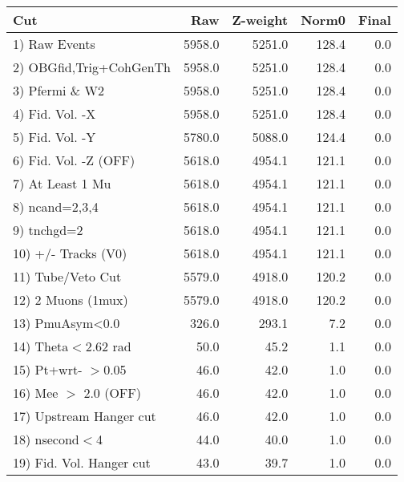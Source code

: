  \begin{table}[h!]\centering
 \begin{tabular}{||l||r|r|r|r||}
 \hline
 \hline
 Cut & Raw & Z-weight & Norm0 & Final \\
 \hline
  1) Raw Events           &      5958.0 &      5251.0 &       128.4 &         0.0 \\
  2) OBGfid,Trig+CohGenTh &      5958.0 &      5251.0 &       128.4 &         0.0 \\
  3) Pfermi \& W2         &      5958.0 &      5251.0 &       128.4 &         0.0 \\
  4) Fid. Vol. -X         &      5958.0 &      5251.0 &       128.4 &         0.0 \\
  5) Fid. Vol. -Y         &      5780.0 &      5088.0 &       124.4 &         0.0 \\
  6) Fid. Vol. -Z (OFF)   &      5618.0 &      4954.1 &       121.1 &         0.0 \\
  7) At Least 1 Mu        &      5618.0 &      4954.1 &       121.1 &         0.0 \\
  8) ncand=2,3,4          &      5618.0 &      4954.1 &       121.1 &         0.0 \\
  9) tnchgd=2             &      5618.0 &      4954.1 &       121.1 &         0.0 \\
 10) +/- Tracks (V0)      &      5618.0 &      4954.1 &       121.1 &         0.0 \\
 11) Tube/Veto Cut        &      5579.0 &      4918.0 &       120.2 &         0.0 \\
 12) 2 Muons (1mux)       &      5579.0 &      4918.0 &       120.2 &         0.0 \\
 13) PmuAsym<0.0          &       326.0 &       293.1 &         7.2 &         0.0 \\
 14) Theta$<$2.62 rad     &        50.0 &        45.2 &         1.1 &         0.0 \\
 15) Pt+wrt- $>$0.05      &        46.0 &        42.0 &         1.0 &         0.0 \\
 16) Mee $>$ 2.0  (OFF)   &        46.0 &        42.0 &         1.0 &         0.0 \\
 17) Upstream Hanger cut  &        46.0 &        42.0 &         1.0 &         0.0 \\
 18) nsecond$<$4          &        44.0 &        40.0 &         1.0 &         0.0 \\
 19) Fid. Vol. Hanger cut &        43.0 &        39.7 &         1.0 &         0.0 \\

\end{tabular}
\end{table}
